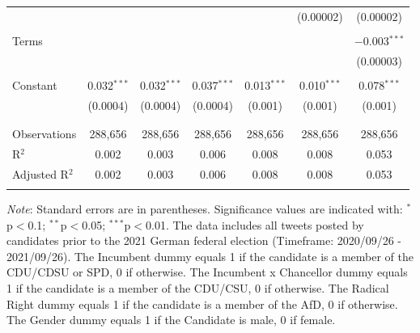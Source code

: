 \documentclass[a4paper,11pt]{article}
\begin{document}
\begin{table}[H]
\begin{tabular}{@{\extracolsep{5pt}}lcccccc}
  &  &  &  &  & (0.00002) & (0.00002) \\ 
  & & & & & & \\ 
 Terms &  &  &  &  &  & $-$0.003$^{***}$ \\ 
  &  &  &  &  &  & (0.00003) \\ 
  & & & & & & \\ 
 Constant & 0.032$^{***}$ & 0.032$^{***}$ & 0.037$^{***}$ & 0.013$^{***}$ & 0.010$^{***}$ & 0.078$^{***}$ \\ 
  & (0.0004) & (0.0004) & (0.0004) & (0.001) & (0.001) & (0.001) \\ 
  & & & & & & \\ 
\hline \\[-1.8ex] 
Observations & 288,656 & 288,656 & 288,656 & 288,656 & 288,656 & 288,656 \\ 
R$^{2}$ & 0.002 & 0.003 & 0.006 & 0.008 & 0.008 & 0.053 \\ 
Adjusted R$^{2}$ & 0.002 & 0.003 & 0.006 & 0.008 & 0.008 & 0.053 \\ 
\hline 
\hline \\[-1.8ex] 
\end{tabular} 
\endgroup 
\vspace{0.5em} %
    \begin{minipage}{0.95\linewidth}
    \scriptsize
    \textit{Note}: Standard errors are in parentheses. Significance values are indicated with: $^*$p$<$0.1; $^{**}$p$<$0.05;
    $^{***}$p$<$0.01. The data includes all tweets posted by candidates prior to the 2021 German federal election (Timeframe:
    2020/09/26 - 2021/09/26). The Incumbent dummy equals 1 if the candidate is a member of the CDU/CDSU or SPD, 0 if otherwise. The
    Incumbent x Chancellor dummy equals 1 if the candidate is a member of the CDU/CSU, 0 if otherwise. The Radical Right dummy equals 1 if
    the candidate is a member of the AfD, 0 if otherwise. The Gender dummy equals 1 if the Candidate is male, 0 if female. 
    \end{minipage}
    \end{table}
\vspace{-.5cm}
\end{document}
